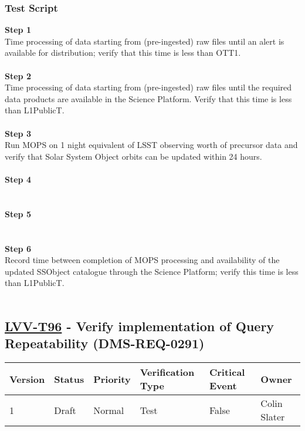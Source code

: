 \hypertarget{test-script-72}{%
\subsubsection{Test Script}\label{test-script-72}}

\textbf{Step 1}\\
Time processing of data starting from (pre-ingested) raw files until an
alert is available for distribution; verify that this time is less than
OTT1.\\
~\\
\textbf{Step 2}\\
Time processing of data starting from (pre-ingested) raw files until the
required data products are available in the Science Platform. Verify
that this time is less than L1PublicT.\\
~\\
\textbf{Step 3}\\
Run MOPS on 1 night equivalent of LSST observing worth of precursor data
and verify that Solar System Object orbits can be updated within 24
hours.\\
~\\
\textbf{Step 4}\\
~\\
~\\
\textbf{Step 5}\\
~\\
~\\
\textbf{Step 6}\\
Record time between completion of MOPS processing and availability of
the updated SSObject catalogue through the Science Platform; verify this
time is less than L1PublicT.\\
~\\

\hypertarget{lvv-t96---verify-implementation-of-query-repeatability-dms-req-0291}{%
\subsection{\texorpdfstring{\href{https://jira.lsstcorp.org/secure/Tests.jspa\#/testCase/LVV-T96}{LVV-T96}
- Verify implementation of Query Repeatability
(DMS-REQ-0291)}{LVV-T96 - Verify implementation of Query Repeatability (DMS-REQ-0291)}}\label{lvv-t96---verify-implementation-of-query-repeatability-dms-req-0291}}

\begin{longtable}[]{@{}llllll@{}}
\toprule
Version & Status & Priority & Verification Type & Critical Event &
Owner\tabularnewline
\midrule
\endhead
1 & Draft & Normal & Test & False & Colin Slater\tabularnewline
\bottomrule
\end{longtable}

